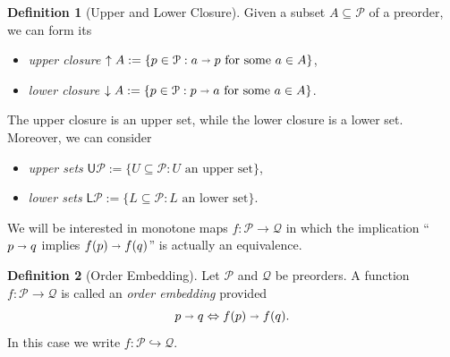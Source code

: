 \documentclass[12pt]{article}
\theoremstyle{definition}
\newtheorem{definition}{Definition}[section]
\theoremstyle{plain}
\theoremstyle{plain}
\theoremstyle{plain}
\theoremstyle{plain}
\theoremstyle{remark}
\theoremstyle{remark}
\newcommand{\mc}[1]{\mathcal{#1}}
\newcommand{\sub}{\subseteq}
\newcommand{\low}{\mathsf{L}}
\newcommand{\upper}{\mathsf{U}}
\newcommand{\upc}[1]{{\uparrow #1}}
\newcommand{\lwc}[1]{{\downarrow #1}}
\begin{document}
\begin{definition}[Upper and Lower Closure]
	Given a subset $A \sub \mc{P}$ of a preorder, we can form its
	\begin{itemize}
		\item \emph{upper closure} $\upc{A} := \{p \in \mc{P} : a \shortrightarrow p \text{ for some } a \in A\}$,
		\item \emph{lower closure} $\lwc{A} := \{p \in \mc{P} : p \shortrightarrow a \text{ for some } a \in A\}$.
	\end{itemize}
	The upper closure is an upper set, while the lower closure is a lower set. Moreover, we can consider
	\begin{itemize}
		\item \emph{upper sets} $\upper\mc{P} := \{U \sub \mc{P}: U \text{ an upper set}\}$,
		\item \emph{lower sets} $\low\mc{P} := \{L \sub \mc{P}: L \text{ an lower set}\}$.
	\end{itemize}
\end{definition}

We will be interested in monotone maps $f: \mc{P} \rightarrow \mc{Q}$ in which the implication ``$p \shortrightarrow q$ implies $f(p) \shortrightarrow f(q)$'' is actually an equivalence.
\begin{definition}[Order Embedding]
	Let $\mc{P}$ and $\mc{Q}$ be preorders. A function $f: \mc{P} \rightarrow \mc{Q}$ is called an \emph{order embedding} provided
	$$ p \shortrightarrow q \Leftrightarrow f(p) \shortrightarrow f(q) .$$
	In this case we write $f: \mc{P} \hookrightarrow \mc{Q}$.
\end{definition}
\end{document}
